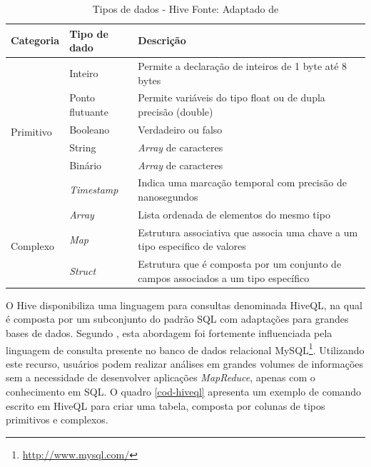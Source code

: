\begin{table}[!ht]
\begin{center}
  \begin{tabular}{|p{3cm}|p{4cm}|p{4cm}|}
  \hline
  Categoria & Tipo de dado & Descrição \\ 
  \hline
  \multirow{6}{*}{Primitivo} 
  & Inteiro 		& Permite a declaração de inteiros de 1 byte até 8 bytes \\ \cline{2-3} 
  & Ponto flutuante 	& Permite variáveis do tipo float ou de dupla precisão (double) \\ \cline{2-3}
  & Booleano		& Verdadeiro ou falso \\ \cline{2-3}
  & String 		& \textit{Array} de caracteres \\ \cline{2-3}
  & Binário 		& \textit{Array} de caracteres \\ \cline{2-3}
  & \textit{Timestamp} 		& Indica uma marcação temporal com precisão de nanosegundos \\
  \hline
  \multirow{3}{*}{Complexo} 
  & \textit{Array} 		& Lista ordenada de elementos do mesmo tipo \\ \cline{2-3} 
  & \textit{Map} 		& Estrutura associativa que associa uma chave a um tipo especifico de valores \\ \cline{2-3}
  & \textit{Struct}		& Estrutura que é composta por um conjunto de campos associados a um tipo específico \\
  \hline
  \end{tabular}
  \captionsetup{justification=centering}
  \caption[Tipos de dados - Hive ]{Tipos de dados - Hive
  \protect\linebreak Fonte: Adaptado de \cite{white2012}}
\label{tab-hive-types}
\end{center}
\end{table}
\FloatBarrier

O Hive disponibiliza uma linguagem para consultas denominada HiveQL, na qual é composta por um subconjunto do padrão SQL com adaptações para grandes bases de dados. Segundo , esta abordagem foi fortemente influenciada pela linguagem de consulta presente no banco de dados relacional MySQL\footnote{\url{http://www.mysql.com/}}. Utilizando este recurso, usuários podem realizar análises em grandes volumes de informações sem a necessidade de desenvolver aplicações \textit{MapReduce}, apenas com o conhecimento em SQL. O quadro \ref{cod-hiveql} apresenta um exemplo de comando escrito em HiveQL para criar uma tabela, composta por colunas de tipos primitivos e complexos.


